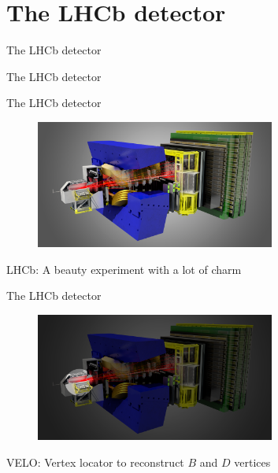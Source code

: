\documentclass{beamer}
\begin{document}
\section{The LHCb detector}
\begin{frame}{The LHCb detector}
  \begin{center}
    {\huge The LHCb detector}
  \end{center}
\end{frame}

\begin{frame}{The LHCb detector}
  \begin{figure}
    \centering
    \includegraphics[width = 0.7\textwidth]{Plots/LHCbDetector.png}
  \end{figure}
  \begin{center}
    \Large LHCb: A beauty experiment with a lot of charm
  \end{center}
\end{frame}

\begin{frame}{The LHCb detector}
  \begin{figure}
    \centering
    \includegraphics[width = 0.7\textwidth]{Plots/LHCbDetector_VELO.png}
  \end{figure}
  \begin{center}
    \Large VELO: Vertex locator to reconstruct $B$ and $D$ vertices
  \end{center}
\end{frame}
\end{document}
